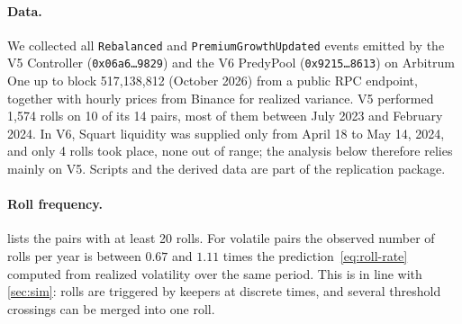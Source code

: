\documentclass[11pt]{article}
\theoremstyle{definition}
\theoremstyle{remark}
\begin{document}
\paragraph{Data.} We collected all \texttt{Rebalanced} and \texttt{PremiumGrowthUpdated} events emitted by the V5 Controller (\texttt{0x06a6\ldots9829}) and the V6 PredyPool (\texttt{0x9215\ldots8613}) on Arbitrum One up to block 517{,}138{,}812 (October 2026) from a public RPC endpoint, together with hourly prices from Binance for realized variance. V5 performed 1{,}574 rolls on 10 of its 14 pairs, most of them between July 2023 and February 2024. In V6, Squart liquidity was supplied only from April 18 to May 14, 2024, and only 4 rolls took place, none out of range; the analysis below therefore relies mainly on V5. Scripts and the derived data are part of the replication package.

\paragraph{Roll frequency.}  lists the pairs with at least 20 rolls. For volatile pairs the observed number of rolls per year is between $0.67$ and $1.11$ times the prediction~\eqref{eq:roll-rate} computed from realized volatility over the same period. This is in line with \cref{sec:sim}: rolls are triggered by keepers at discrete times, and several threshold crossings can be merged into one roll.

\begin{table}[t]
  \centering
  \scriptsize
  
  \caption{Rolls of Predy V5 on Arbitrum One for pairs with at least 20 rolls. $h$ and $\theta$ are the range half-width and roll threshold in ticks ($1\text{ tick}\approx 0.01\%$). The prediction $\sigma^2/(h-\theta)^2$ uses realized volatility from hourly Binance prices over the period shown; it is not available for stablecoin pairs.}
  \label{tab:onchain}
\end{table}
\end{document}
